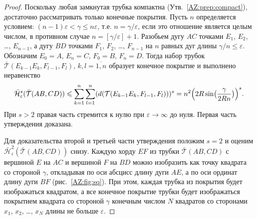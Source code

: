\documentclass[12pt]{article}
\begin{document}
\begin{proof}
  Поскольку любая замкнутая трубка компактна (Утв.~\ref{AZ:prep:compact}),
  достаточно рассматривать только конечные покрытия. Пусть $n$ определяется
  условием: $(n-1)\varepsilon<\gamma\leqslant n\varepsilon$,
  т.е. $n=\gamma/\varepsilon$, если это отношение является целым числом, в
  противном случае $n=[\gamma/\varepsilon]+1$. Разобьем дугу $AC$ точками $E_1$,
  $E_2$, \ldots, $E_{n-1}$, а дугу $BD$ точками $F_1$, $F_2$, \ldots, $F_{n-1}$
  на $n$ равных дуг длины $\gamma/n\leqslant\varepsilon$. Обозначим $E_0=A$,
  $E_n=C$, $F_0=B$, $F_n=D$. Тогда набор трубок
  $\bar{\mathcal T}(E_{k-1}E_k, F_{l-1},F_l)$, $k,l=\overline{1,n}$ образует
  конечное покрытие и выполнено неравенство
  \begin{equation}
    \bar{\mathcal H}^s_\varepsilon (\bar{\mathcal T}(AB,CD) )\leqslant
    \sum_{k=1}^n \sum_{l=1}^n (d(\mathcal T(E_{k-1}E_k, F_{l-1},F_l)))^s=
    n^2 \Bigl(2R\sin\bigl( \frac{\gamma}{2Rn}\bigr)\Bigr)^s.
    \label{AZ:eq:Hsup}
  \end{equation}
При $s>2$ правая часть стремится к нулю при  $\varepsilon\to\infty$ до
  нуля. Первая часть утверждения доказана.

  Для доказательства второй и третьей части утверждения положим $s=2$ и оценим
  $\bar{\mathcal H}^2_\varepsilon(\bar{\mathcal T}(AB,CD))$ снизу. Каждую хорду
  $EF$ из трубки $\bar{\mathcal T}(AB,CD)$ с вершиной $E$ на $AC$ и вершиной $F$
  на $BD$ можно изобразить как точку квадрата со стороной $\gamma$, откладывая
  по оси абсцисс длину дуги $AE$, а по оси ординат длину дуги $BF$
  (рис.~\ref{AZ:fig:sq}). При этом, каждая трубка из покрытия будет изображаться
  квадратом, а все конечное покрытие трубки будет изображаться покрытием
  квадрата со стороной $\gamma$ конечным числом $N$ квадратов со сторонами
  $x_1$, $x_2$, \ldots, $x_N$ длины не больше $\varepsilon$.
  

\end{proof}
\end{document}
